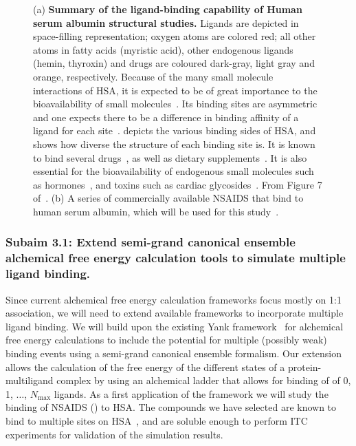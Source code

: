 \documentclass[10pt,final]{article}
\begin{document}
\begin{figure}[H]
\caption{(a) \textbf{Summary of the ligand-binding capability of Human serum albumin structural studies.} Ligands are depicted in space-filling representation; oxygen atoms are colored red; all other atoms in fatty acids (myristic acid), other endogenous ligands (hemin, thyroxin) and drugs are coloured dark-gray, light gray and orange, respectively. Because of the many small molecule interactions of HSA, it is expected to be of great importance to the bioavailability of small molecules~\autocite{Metcalfe2010a}. Its binding sites are asymmetric~\autocite{He1992a, Curry1998a} and one expects there to be a difference in binding affinity of a ligand for each site~\autocite{Sudlow1976a}.  depicts the various binding sides of HSA, and shows how diverse the structure of each binding site is. It is known to bind several drugs~\autocite{SJOeHOLM1979a,Bannwarth1996a,Sulkowska2002a,Ghuman2005a,Perez2007a,Zsila2011a}, as well as dietary supplements~\autocite{Pal2013a}. It is also essential for the bioavailability of endogenous small molecules such as hormones~\autocite{Pardridge1986a}, and toxins such as cardiac glycosides~\autocite{Smith1985a}. From Figure 7 of~\autocite{Ghuman2005a}. (b) A series of commercially available NSAIDS that bind to human serum albumin, which will be used for this study~\autocite{Zsila2011a}.}
\label{figure:hsa}
\end{figure} 

\subsubsection*{Subaim 3.1: Extend semi-grand canonical ensemble alchemical free energy calculation tools to simulate multiple ligand binding.}
Since current alchemical free energy calculation frameworks focus mostly on 1:1 association, we will need to extend available frameworks to incorporate multiple ligand binding. 
%
We will build upon the existing Yank framework~\autocite{Chodera2015a} for alchemical free energy calculations to include the potential for multiple (possibly weak) binding events using a semi-grand canonical ensemble formalism. 
%
Our extension allows the calculation of the free energy of the different states of a protein-multiligand complex by using an alchemical ladder that allows for binding of of 0, 1, $\dots$, $N_\mathrm{max}$ ligands.
%
As a first application of the framework we will study the binding of NSAIDS () to HSA.
%
The compounds we have selected are known to bind to multiple sites on HSA~\autocite{Zsila2011a}, and are soluble enough to perform ITC experiments for validation of the simulation results.
%
\end{document}
